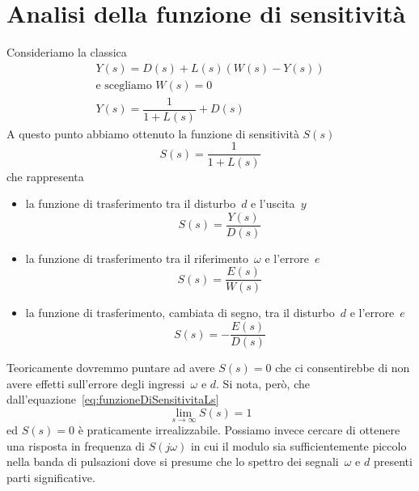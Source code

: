 \documentclass[a4paper]{report}
\begin{document}
\section{Analisi della funzione di sensitivit\`a}
Consideriamo la classica
\[
\begin{array}{l}
  Y(s) = D(s) + L(s)(W(s) - Y(s))\\
  \textrm{e scegliamo } W(s) = 0\\
  Y(s) = \dfrac{1}{1 + L(s)} + D(s)
\end{array}
\]
A questo punto abbiamo ottenuto la funzione di sensitivit\`a $S(s)$
\begin{equation}\label{eq:funzioneDiSensitivitaLs}
S(s) = \dfrac{1}{1 + L(s)}
\end{equation}
che rappresenta
\begin{itemize}
\item la funzione di trasferimento tra il disturbo~$d$ e l'uscita~$y$
  \[
   S(s)  = \dfrac{Y(s)}{D(s)}
  \]
\item la funzione di trasferimento tra il riferimento~$\omega$ e
  l'errore~$e$
  \[
  S(s) = \dfrac{E(s)}{W(s)}
  \]
\item la funzione di trasferimento, cambiata di segno, tra il
  disturbo~$d$ e l'errore~$e$
  \[
  S(s) = - \dfrac{E(s)}{D(s)}
  \]
\end{itemize}
Teoricamente dovremmo puntare ad avere $S(s) = 0$ che ci consentirebbe
di non avere effetti sull'errore degli ingressi~$\omega$ e $d$. Si
nota, per\`o, che dall'equazione~\ref{eq:funzioneDiSensitivitaLs}
\[
\lim_{s \to \infty} S(s) = 1
\]
ed $S(s) = 0$ \`e praticamente irrealizzabile.
Possiamo invece cercare di ottenere una risposta in frequenza di $S(j
\omega)$ in cui il modulo sia sufficientemente piccolo nella banda di
pulsazioni dove si presume che lo spettro dei segnali~$\omega$ e $d$
presenti parti significative.
\end{document}
